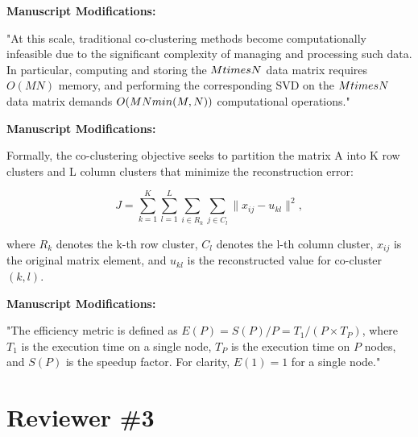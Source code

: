 \documentclass{ar2rc}
\begin{document}
\textbf{Manuscript Modifications:}

"At this scale, traditional co-clustering methods become computationally infeasible due to the significant complexity of managing and processing such data. In particular, computing and storing the $M \\times N$ data matrix requires $O(MN)$ memory, and performing the corresponding SVD on the $M \\times N$ data matrix demands $O(MN\\min(M,N))$ computational operations."



\textbf{Manuscript Modifications:}

Formally, the co-clustering objective seeks to partition the matrix A into K row clusters and L column clusters that minimize the reconstruction error:

\begin{equation}
  J = \sum_{k=1}^{K} \sum_{l=1}^{L} \sum_{i \in R_k} \sum_{j \in C_l} \| x_{ij} - u_{kl} \|^2,
\end{equation}

where $R_k$ denotes the k-th row cluster, $C_l$ denotes the l-th column cluster, $x_{ij}$ is the original matrix element, and $u_{kl}$ is the reconstructed value for co-cluster $(k,l)$.



\textbf{Manuscript Modifications:}

"The efficiency metric is defined as $E(P) = S(P)/P = T_1/(P \times T_P)$, where $T_1$ is the execution time on a single node, $T_P$ is the execution time on $P$ nodes, and $S(P)$ is the speedup factor. For clarity, $E(1) = 1$ for a single node."


\section{Reviewer \#3}
\end{document}
